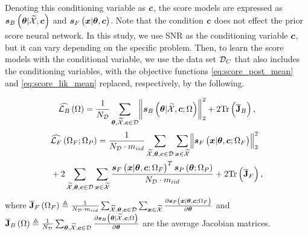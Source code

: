 {Denoting this conditioning variable as $\bm{c}$,  the score models are expressed as $\bm{s}_{B}\left(\bm{\theta}|\widetilde{\mathcal{X}},\bm{c}\right)$ and $\bm{s}_{F}\left(\bm{x}|\bm{\theta},\bm{c}\right)$.
Note that the condition $\bm{c}$ does not effect the prior score neural network. %
In this study, {we use SNR as the conditioning variable $\bm{c}$,
but it can vary depending on the specific problem. }
Then, to {learn} the score models with the conditional variable, we use 
{the data set $\mathcal{D}_C$ that also includes the conditioning variables, 
with the objective functions \eqref{eq:score_post_mean} and} \eqref{eq:score_lik_mean} replaced, respectively, by the following.
}



\begin{equation*}
    \widehat{\mathcal{L}_{B}}\left(\Omega\right)=\frac{1}{N_{\mathcal{D}}}\sum_{\bm{\theta},\widetilde{\mathcal{X}},\bm{c}\in\mathcal{D}}\norm{\bm{s}_{B}\left(\bm{\theta}|\widetilde{\mathcal{X}},\bm{c};\Omega\right)}_2^2+2\mathrm{Tr}\left(\overline{\mathbf{J}}_B\right),
\end{equation*}
\begin{align*}
    &\widehat{\mathcal{L}_{F}}\left(\Omega_{F}; \Omega_{P}\right)=\frac{1}{N_{\mathcal{D}}\cdot m_{iid}}\sum_{\widetilde{\mathcal{X}},\bm{\theta},\bm{c}\in\mathcal{D}}\sum_{\bm{x}\in\widetilde{\mathcal{X}}}\norm{\bm{s}_{F}\left(\bm{x}|\bm{\theta},\bm{c};\Omega_{F}\right)}_2^2\nonumber \\
    &+2\sum_{\widetilde{\mathcal{X}},\bm{\theta},\bm{c}\in\mathcal{D}}\sum_{\bm{x}\in\widetilde{\mathcal{X}}}\frac{\bm{s}_{F}\left(\bm{x}|\bm{\theta},\bm{c};\Omega_{F}\right)^T\bm{s}_{P}\left(\bm{\theta};\Omega_{P}\right)}{N_{\mathcal{D}}\cdot m_{iid}}+2\mathrm{Tr}\left(\overline{\mathbf{J}}_{F}\right),
\end{align*}
where $\overline{\mathbf{J}}_{F}\left(\Omega_{F}\right)\triangleq\frac{1}{N_{\mathcal{D}}\cdot m_{iid}}\sum_{\widetilde{\mathcal{X}},\bm{\theta},\bm{c}\in\mathcal{D}}\sum_{\bm{x}\in\widetilde{\mathcal{X}}}{\frac{\partial \bm{s}_{F}\left(\bm{x}|\bm{\theta},\bm{c};\Omega_{F}\right)}{\partial\bm{\theta}}}$ 
and $\overline{\mathbf{J}}_B\left(\Omega\right)\triangleq\frac{1}{N_{\mathcal{D}}}\sum_{\bm{\theta},\widetilde{\mathcal{X}},\bm{c}\in\mathcal{D}}{\frac{\partial \bm{s}_{B}\left(\bm{\theta}|\widetilde{\mathcal{X}},\bm{c};\Omega\right)}{\partial\bm{\theta}}}$ are the average Jacobian matrices. 

